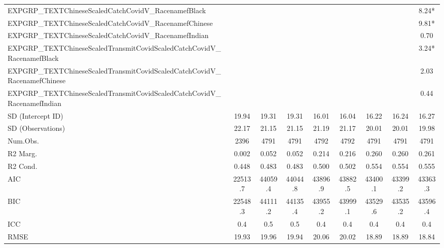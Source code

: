 \documentclass[]{report}
\begin{document}
\begin{table}
{\begin{tabular}[t]{lcccccccc}
		EXPGRP\_TEXTChineseScaledCatchCovidV\_RacenamefBlack &  &  &  &  &  &  &  & \num{8.24}*\\
		EXPGRP\_TEXTChineseScaledCatchCovidV\_RacenamefChinese &  &  &  &  &  &  &  & \num{9.81}*\\
		EXPGRP\_TEXTChineseScaledCatchCovidV\_RacenamefIndian &  &  &  &  &  &  &  & \num{0.70}\\
		EXPGRP\_TEXTChineseScaledTransmitCovidScaledCatchCovidV\_RacenamefBlack &  &  &  &  &  &  &  & \num{3.24}*\\
		EXPGRP\_TEXTChineseScaledTransmitCovidScaledCatchCovidV\_RacenamefChinese &  &  &  &  &  &  &  & \num{2.03}\\
		EXPGRP\_TEXTChineseScaledTransmitCovidScaledCatchCovidV\_RacenamefIndian &  &  &  &  &  &  &  & \num{0.44}\\
		SD (Intercept ID) & \num{19.94} & \num{19.31} & \num{19.31} & \num{16.01} & \num{16.04} & \num{16.22} & \num{16.24} & \num{16.27}\\
		SD (Observations) & \num{22.17} & \num{21.15} & \num{21.15} & \num{21.19} & \num{21.17} & \num{20.01} & \num{20.01} & \num{19.98}\\
		\midrule
		Num.Obs. & \num{2396} & \num{4791} & \num{4791} & \num{4792} & \num{4792} & \num{4791} & \num{4791} & \num{4791}\\
		R2 Marg. & \num{0.002} & \num{0.052} & \num{0.052} & \num{0.214} & \num{0.216} & \num{0.260} & \num{0.260} & \num{0.261}\\
		R2 Cond. & \num{0.448} & \num{0.483} & \num{0.483} & \num{0.500} & \num{0.502} & \num{0.554} & \num{0.554} & \num{0.555}\\
		AIC & \num{22513.7} & \num{44059.4} & \num{44044.8} & \num{43896.9} & \num{43882.5} & \num{43400.1} & \num{43399.2} & \num{43363.3}\\
		BIC & \num{22548.3} & \num{44111.2} & \num{44135.4} & \num{43955.2} & \num{43999.1} & \num{43529.6} & \num{43535.2} & \num{43596.4}\\
		ICC & \num{0.4} & \num{0.5} & \num{0.5} & \num{0.4} & \num{0.4} & \num{0.4} & \num{0.4} & \num{0.4}\\
		RMSE & \num{19.93} & \num{19.96} & \num{19.94} & \num{20.06} & \num{20.02} & \num{18.89} & \num{18.89} & \num{18.84}\\
		\bottomrule
	\end{tabular}}
\end{table}
\end{document}
